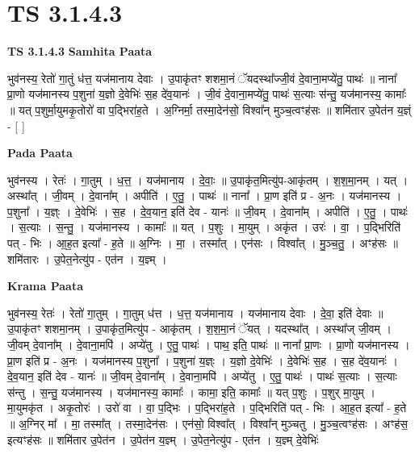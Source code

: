 \documentclass[17pt]{extarticle}
\begin{document}
\section{ TS 3.1.4.3 }

\textbf{TS 3.1.4.3 } \newline
\textbf{Samhita Paata} \newline

भुव॑नस्य॒ रेतो॑ गा॒तुं ध॑त्त॒ यज॑मानाय देवाः । उ॒पाकृ॑तꣳ शशमा॒नं ॅयदस्था᳚ज्जी॒वं दे॒वाना॒मप्ये॑तु॒ पाथः॑ ॥ नाना᳚ प्रा॒णो यज॑मानस्य प॒शुना॑ य॒ज्ञो दे॒वेभिः॑ स॒ह दे॑व॒यानः॑ । जी॒वं दे॒वाना॒मप्ये॑तु॒ पाथः॑ स॒त्याः स॑न्तु॒ यज॑मानस्य॒ कामाः᳚ ॥ यत् प॒शुर्मा॒युमकृ॒तोरो॑ वा प॒द्भिरा॑ह॒ते । अ॒ग्निर्मा॒ तस्मा॒देन॑सो॒ विश्वा᳚न् मुञ्च॒त्वꣳह॑सः ॥ शमि॑तार उ॒पेत॑न य॒ज्ञ्ं - [  ] \newline

\textbf{Pada Paata} \newline

भुव॑नस्य । रेतः॑ । गा॒तुम् । ध॒त्त॒ । यज॑मानाय । दे॒वाः॒ ॥ उ॒पाकृ॑त॒मित्यु॑प-आकृ॑तम् । श॒श॒मा॒नम् । यत् । अस्था᳚त् । जी॒वम् । दे॒वाना᳚म् । अपीति॑ । ए॒तु॒ । पाथः॑ ॥ नाना᳚ । प्रा॒ण इति॑ प्र - अ॒नः । यज॑मानस्य । प॒शुना᳚ । य॒ज्ञ्ः । दे॒वेभिः॑ । स॒ह । दे॒व॒यान॒ इति॑ देव - यानः॑ ॥ जी॒वम् । दे॒वाना᳚म् । अपीति॑ । ए॒तु॒ । पाथः॑ । स॒त्याः । स॒न्तु॒ । यज॑मानस्य । कामाः᳚ ॥ यत् । प॒शुः । मा॒युम् । अकृ॑त । उरः॑ । वा॒ । प॒द्भिरिति॑ पत् - भिः । आ॒ह॒त इत्या᳚ - ह॒ते ॥ अ॒ग्निः । मा॒ । तस्मा᳚त् । एन॑सः । विश्वा᳚त् । मु॒ञ्च॒तु॒ । अꣳह॑सः ॥ शमि॑तारः । उ॒पेत॒नेत्यु॑प - एत॑न । य॒ज्ञ्म् ।  \newline


\textbf{Krama Paata} \newline

भुव॑नस्य॒ रेतः॑ । रेतो॑ गा॒तुम् । गा॒तुम् ध॑त्त । ध॒त्त॒ यज॑मानाय । यज॑मानाय देवाः । दे॒वा॒ इति॑ देवाः ॥ उ॒पाकृ॑तꣳ शशमा॒नम् । उ॒पाकृ॑त॒मित्यु॑प - आकृ॑तम् । श॒श॒मा॒नं ॅयत् । यदस्था᳚त् । अस्था᳚ज् जी॒वम् । जी॒वम् दे॒वाना᳚म् । दे॒वाना॒मपि॑ । अप्ये॑तु । ए॒तु॒ पाथः॑ । पाथ॒ इति॒ पाथः॑ ॥ नाना᳚ प्रा॒णः । प्रा॒णो यज॑मानस्य । प्रा॒ण इति॑ प्र - अ॒नः । यज॑मानस्य प॒शुना᳚ । प॒शुना॑ य॒ज्ञ्ः । य॒ज्ञो दे॒वेभिः॑ । दे॒वेभिः॑ स॒ह । स॒ह दे॑व॒यानः॑ । दे॒व॒यान॒ इति॑ देव - यानः॑ ॥ जी॒वम् दे॒वाना᳚म् । दे॒वाना॒मपि॑ । अप्ये॑तु । ए॒तु॒ पाथः॑ । पाथः॑ स॒त्याः । स॒त्याः स॑न्तु । स॒न्तु॒ यज॑मानस्य । यज॑मानस्य॒ कामाः᳚ । कामा॒ इति॒ कामाः᳚ ॥ यत् प॒शुः । प॒शुर् मा॒युम् । मा॒युमकृ॑त । अकृ॒तोरः॑ । उरो॑ वा । वा॒ प॒द्भिः । प॒द्भिरा॑ह॒ते । प॒द्भिरिति॑ पत् - भिः । आ॒ह॒त इत्या᳚ - ह॒ते ॥ अ॒ग्निर् मा᳚ । मा॒ तस्मा᳚त् । तस्मा॒देन॑सः । एन॑सो॒ विश्वा᳚त् । विश्वा᳚न् मुञ्चतु । मु॒ञ्च॒त्वꣳह॑सः । अꣳह॑स॒ इत्यꣳह॑सः ॥ शमि॑तार उ॒पेत॑न । उ॒पेत॑न य॒ज्ञ्म् । उ॒पेत॒नेत्यु॑प - एत॑न । य॒ज्ञ्म् दे॒वेभिः॑ \newline
\end{document}
